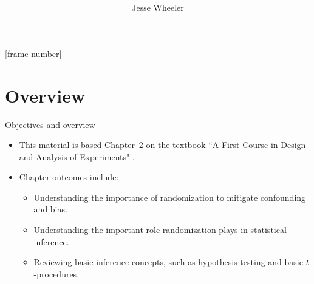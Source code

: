 





\newcommand\CHAPTER{1}
 \newcommand\answer[2]{#1} %

\title{\vspace{2mm} }
\author{Jesse Wheeler}
\date{}

[frame number]






\maketitle



\section{Overview}

\begin{frame}[allowframebreaks]{Objectives and overview}
  \begin{itemize}
    \item This material is based Chapter~2 on the textbook ``A First Course in Design and Analysis of Experiments" \citep{oehlert2000}.
    \item Chapter outcomes include: 
    \begin{itemize}
      \item Understanding the importance of randomization to mitigate confounding and bias.
      \item Understanding the important role randomization plays in statistical inference.
      \item Reviewing basic inference concepts, such as hypothesis testing and basic $t$-procedures.
    \end{itemize}
  \end{itemize}
\end{frame}

